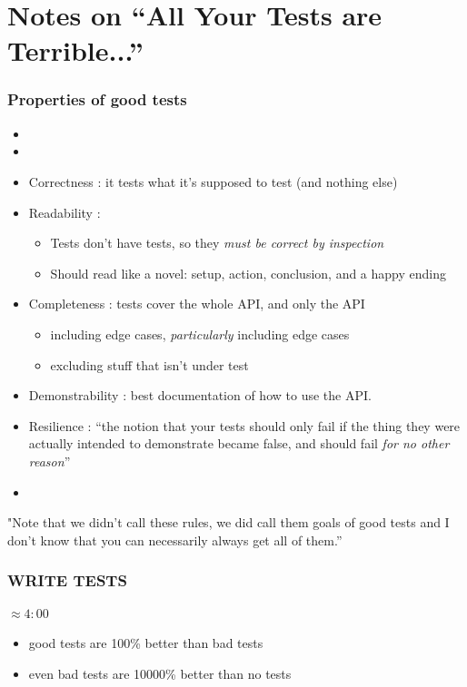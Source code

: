 \section{Notes on ``All Your Tests are Terrible...''}
\begin{frame}[fragile,t]
\frametitle{Properties of good tests}

\begin{itemize}
\item {}
\item {}
\item Correctness : it tests what it's supposed to test (and
  nothing else)
\item Readability :
\begin{itemize}
  \item Tests don't have tests, so they \emph{must be correct by inspection}
  \item Should read like a novel: setup, action, conclusion, and a happy ending
\end{itemize}
\item Completeness : tests cover the whole API, and only the API
  \begin{itemize}
  \item including edge cases, \emph{particularly} including edge cases
  \item excluding stuff that isn't under test
  \end{itemize}
\item Demonstrability : best documentation of how to use the API.
\item Resilience : ``the notion that your tests should only fail if the
  thing they were actually intended to demonstrate became false, and
  should fail \emph{for no other reason}''
\item {}
\end{itemize}

"Note that we didn't call these rules, we did call them goals of good
tests and I don't know that you can necessarily always get all of
them.''
\end{frame}

\begin{frame}[fragile,t]
\frametitle{WRITE TESTS}
\framesubtitle{$\approx 4:00$}
\begin{itemize}
\item good tests are 100\% better than bad tests
\item even bad tests are 10000\% better than no tests
\end{itemize}

\end{frame}

